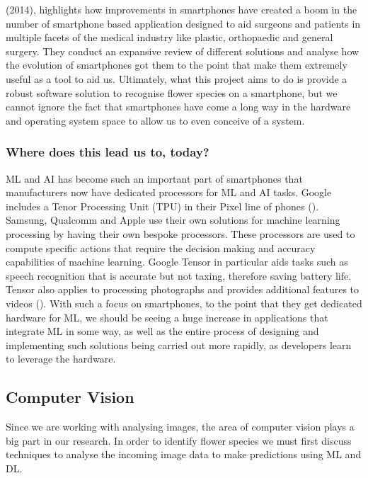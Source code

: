 \documentclass{article}
\begin{document}
\par

\citeauthor{kulendran2014} (2014), highlights how improvements in smartphones have created a boom in the number of 
smartphone based application designed to aid surgeons and patients in multiple facets of the medical industry like 
plastic, orthopaedic and general surgery. They conduct an expansive review of different solutions and analyse how the 
evolution of smartphones got them to the point that make them extremely useful as a tool to aid us. Ultimately, what 
this project aims to do is provide a robust software solution to recognise flower species on a smartphone, but we 
cannot ignore the fact that smartphones have come a long way in the hardware and operating system space to allow us to 
even conceive of a system.

\subsubsection{Where does this lead us to, today?}

ML and AI has become such an important part of smartphones that manufacturers now have dedicated processors for ML and 
AI tasks. Google includes a Tenor Processing Unit (TPU) in their Pixel line of phones (\cite{triggs2021}). Samsung, 
Qualcomm and Apple use their own solutions for machine learning processing by having their own bespoke processors. These 
processors are used to compute specific actions that require the decision making and accuracy capabilities of machine 
learning. Google Tensor in particular aids tasks such as speech recognition that is accurate but not taxing, therefore 
saving battery life. Tensor also applies to processing photographs and provides additional features to videos 
(\cite{gupta2021}). With such a focus on smartphones, to the point that they get dedicated hardware for ML, we should be 
seeing a huge increase in applications that integrate ML in some way, as well as the entire process of designing and 
implementing such solutions being carried out more rapidly, as developers learn to leverage the hardware.

\subsection{Computer Vision}

Since we are working with analysing images, the area of computer vision plays a big part in our research. In order to 
identify flower species we must first discuss techniques to analyse the incoming image data to make predictions using
ML and DL.
\end{document}
